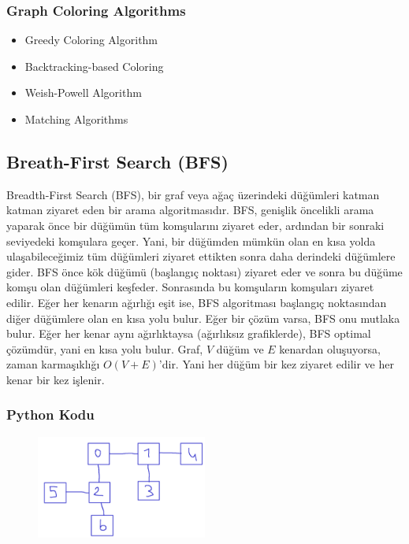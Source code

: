 \subsubsection{Graph Coloring Algorithms}

\begin{itemize}
    \item Greedy Coloring Algorithm
    \item Backtracking-based Coloring
    \item Weish-Powell Algorithm
    \item Matching Algorithms
\end{itemize}

\newpage

\subsection{Breath-First Search (BFS)}

Breadth-First Search (BFS), bir graf veya ağaç üzerindeki düğümleri katman katman ziyaret eden bir arama algoritmasıdır. BFS, genişlik öncelikli arama yaparak önce bir düğümün tüm komşularını ziyaret eder, ardından bir sonraki seviyedeki komşulara geçer. Yani, bir düğümden mümkün olan en kısa yolda ulaşabileceğimiz tüm düğümleri ziyaret ettikten sonra daha derindeki düğümlere gider. BFS önce kök düğümü (başlangıç noktası) ziyaret eder ve sonra bu düğüme komşu olan düğümleri keşfeder. Sonrasında bu komşuların komşuları ziyaret edilir. Eğer her kenarın ağırlığı eşit ise, BFS algoritması başlangıç noktasından diğer düğümlere olan en kısa yolu bulur. Eğer bir çözüm varsa, BFS onu mutlaka bulur. Eğer her kenar aynı ağırlıktaysa (ağırlıksız grafiklerde), BFS optimal çözümdür, yani en kısa yolu bulur. Graf, $V$ düğüm ve $E$ kenardan oluşuyorsa, zaman karmaşıklığı $O(V + E)$'dir. Yani her düğüm bir kez ziyaret edilir ve her kenar bir kez işlenir.

\subsubsection{Python Kodu}

\begin{figure}[h]
    \centering
    \includegraphics[width=0.5\textwidth]{images/bfs.png}
    \caption{}
\end{figure}

